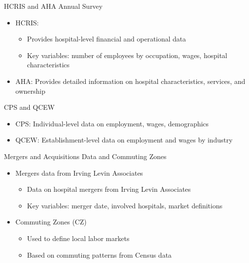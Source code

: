 \documentclass{beamer}
\begin{document}
\begin{frame}{HCRIS and AHA Annual Survey}
  \begin{itemize}
    \item HCRIS:
    \begin{itemize}
      \item Provides hospital-level financial and operational data
      \item Key variables: number of employees by occupation, wages, hospital characteristics
    \end{itemize}
    \item AHA: Provides detailed information on hospital characteristics, services, and ownership
  \end{itemize}
\end{frame}

\begin{frame}{CPS and QCEW}
  \begin{itemize}
    \item CPS: Individual-level data on employment, wages, demographics
    \item QCEW: Establishment-level data on employment and wages by industry
  \end{itemize}
\end{frame}

\begin{frame}{Mergers and Acquisitions Data and Commuting Zones}
  \begin{itemize}
    \item Mergers data from Irving Levin Associates
    \begin{itemize}
      \item Data on hospital mergers from Irving Levin Associates
      \item Key variables: merger date, involved hospitals, market definitions
    \end{itemize}
    \item Commuting Zones (CZ)
    \begin{itemize}
      \item Used to define local labor markets
      \item Based on commuting patterns from Census data
    \end{itemize}
  \end{itemize}
\end{frame}
\end{document}
